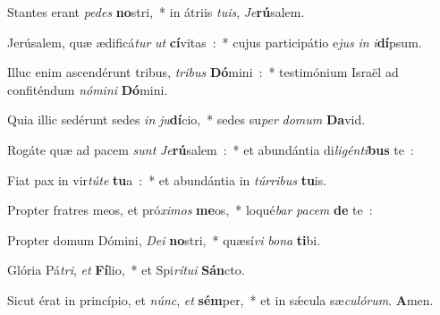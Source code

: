 ﻿\item Stantes erant \emph{pe}\-\emph{des} \textbf{no}\-stri,~* in átriis \emph{tu}\-\emph{is}, \emph{Je}\textbf{rú}salem.
\item Jerúsalem, quæ ædificá\emph{tur} \emph{ut} \textbf{cí}\-vitas~:~* cujus participátio e\emph{jus} \emph{in} \emph{i}\textbf{dí}psum.
\item Illuc enim ascendérunt tribus, \emph{tri}\-\emph{bus} \textbf{Dó}\-mi\-ni~:~* testimónium Israël ad confiténdum \emph{nó}\-\emph{mi}\-\emph{ni} \textbf{Dó}mini.
\item Quia illic sedérunt sedes \emph{in} \emph{ju}\-\textbf{dí}\-cio,~* sedes su\emph{per} \emph{do}\-\emph{mum} \textbf{Da}vid.
\item Rogáte quæ ad pacem \emph{sunt} \emph{Je}\-\textbf{rú}\-sa\-lem~:~* et abundántia di\-\emph{li}\-\emph{gén}\-\emph{ti}\-\textbf{bus} te~:
\item Fiat pax in vir\emph{tú}\-\emph{te} \textbf{tu}a~:~* et abundántia in \emph{túr}\-\emph{ri}\-\emph{bus} \textbf{tu}is.
\item Propter fratres meos, et pró\-\emph{xi}\-\emph{mos} \textbf{me}\-os,~* loqué\emph{bar} \emph{pa}\emph{cem} \textbf{de} te~:
\item Propter domum Dómini, \emph{De}\-\emph{i} \textbf{no}\-stri,~* quæsí\emph{vi} \emph{bo}\-\emph{na} \textbf{ti}bi.
\item Glória Pá\emph{tri}, \emph{et} \textbf{Fí}\-lio,~* et Spi\emph{rí}\-\emph{tu}\-\emph{i} \textbf{Sán}cto.
\item Sicut érat in princípio, et \emph{núnc}, \emph{et} \textbf{sém}\-per,~* et in sǽcula sæ\emph{cu}\-\emph{ló}\-\emph{rum}. \textbf{A}men.

